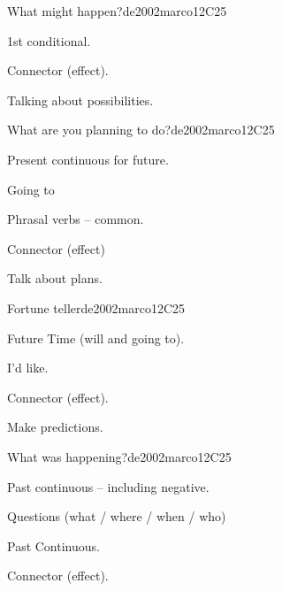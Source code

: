 \begin{syllabus}
\begin{unit}{What might happen?}{}{de2002marco}{12}{C25}
   \begin{topics}
      \item 1st conditional.
      \item Connector (effect).
   \end{topics}

   \begin{learningoutcomes}
      \item Talking about possibilities.
   \end{learningoutcomes}
\end{unit}

\begin{unit}{What are you planning to do?}{}{de2002marco}{12}{C25}
   \begin{topics}
      \item Present continuous for future.
      \item Going to 
      \item Phrasal verbs – common.
      \item Connector (effect)
   \end{topics}

   \begin{learningoutcomes}
      \item Talk about plans.
   \end{learningoutcomes}
\end{unit}

\begin{unit}{Fortune teller}{}{de2002marco}{12}{C25}
   \begin{topics}
      \item Future Time (will and going to).
      \item I’d like.
      \item Connector (effect).
   \end{topics}

   \begin{learningoutcomes}
      \item Make predictions.
   \end{learningoutcomes}
\end{unit}

\begin{unit}{What was happening?}{}{de2002marco}{12}{C25}
   \begin{topics}
      \item Past continuous – including negative.
      \item Questions (what / where / when / who)
      \item Past Continuous.
      \item Connector (effect).
   \end{topics}


\end{unit}
\end{syllabus}
